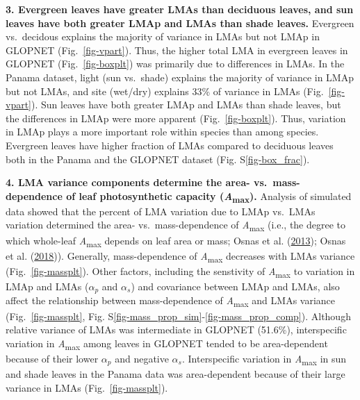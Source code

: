 \documentclass[
  12pt,
  a4paper,
,tablecaptionabove
]{scrartcl}
\begin{document}
\textbf{3. Evergreen leaves have greater LMAs than deciduous leaves, and
sun leaves have both greater LMAp and LMAs than shade leaves.} Evergreen
vs.~decidous explains the majority of variance in LMAs but not LMAp in
GLOPNET (Fig.~\ref{fig-vpart}). Thus, the higher total LMA in evergreen
leaves in GLOPNET (Fig.~\ref{fig-boxplt}) was primarily due to
differences in LMAs. In the Panama dataset, light (sun vs.~shade)
explains the majority of variance in LMAp but not LMAs, and site
(wet/dry) explains 33\% of variance in LMAs (Fig.~\ref{fig-vpart}). Sun
leaves have both greater LMAp and LMAs than shade leaves, but the
differences in LMAp were more apparent (Fig.~\ref{fig-boxplt}). Thus,
variation in LMAp plays a more important role within species than among
species. Evergreen leaves have higher fraction of LMAs compared to
deciduous leaves both in the Panama and the GLOPNET dataset (Fig.
S\ref{fig-box_frac}).

\textbf{4. LMA variance components determine the area-
vs.~mass-dependence of leaf photosynthetic capacity
(\emph{A}\textsubscript{max}).} Analysis of simulated data showed that
the percent of LMA variation due to LMAp vs.~LMAs variation determined
the area- vs.~mass-dependence of \emph{A}\textsubscript{max} (i.e., the
degree to which whole-leaf \emph{A}\textsubscript{max} depends on leaf
area or mass; Osnas et al. (\protect\hyperlink{ref-Osnas2013}{2013});
Osnas et al. (\protect\hyperlink{ref-Osnas2018}{2018})). Generally,
mass-dependence of \emph{A}\textsubscript{max} decreases with LMAs
variance (Fig.~\ref{fig-massplt}). Other factors, including the
senstivity of \emph{A}\textsubscript{max} to variation in LMAp and LMAs
(\(\alpha_p\) and \(\alpha_s\)) and covariance between LMAp and LMAs,
also affect the relationship between mass-dependence of
\emph{A}\textsubscript{max} and LMAs variance (Fig.~\ref{fig-massplt},
Fig. S\ref{fig-mass_prop_sim}-\ref{fig-mass_prop_comp}). Although
relative variance of LMAs was intermediate in GLOPNET (51.6\%),
interspecific variation in \emph{A}\textsubscript{max} among leaves in
GLOPNET tended to be area-dependent because of their lower \(\alpha_p\)
and negative \(\alpha_s\). Interspecific variation in
\emph{A}\textsubscript{max} in sun and shade leaves in the Panama data
was area-dependent because of their large variance in LMAs
(Fig.~\ref{fig-massplt}).
\end{document}
